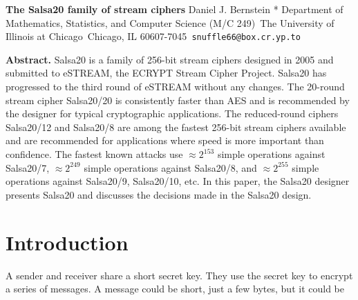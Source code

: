 \documentclass{article}
\begin{document}

\begin{center}
\Large \textbf{The Salsa20 family of stream ciphers}
\vspace{1cm}
\large Daniel J. Bernstein *
\small Department of Mathematics, Statistics, and Computer Science (M/C 249)\
The University of Illinois at Chicago\
Chicago, IL 60607-7045\
\texttt{snuffle66@box.cr.yp.to}
\end{center}

\noindent \textbf{Abstract.} Salsa20 is a family of 256-bit stream ciphers designed in 2005 and submitted to eSTREAM, the ECRYPT Stream Cipher Project. Salsa20 has progressed to the third round of eSTREAM without any changes. The 20-round stream cipher Salsa20/20 is consistently faster than AES and is recommended by the designer for typical cryptographic applications. The reduced-round ciphers Salsa20/12 and Salsa20/8 are among the fastest 256-bit stream ciphers available and are recommended for applications where speed is more important than confidence. The fastest known attacks use $\approx 2^{153}$ simple operations against Salsa20/7, $\approx 2^{249}$ simple operations against Salsa20/8, and $\approx 2^{255}$ simple operations against Salsa20/9, Salsa20/10, etc. In this paper, the Salsa20 designer presents Salsa20 and discusses the decisions made in the Salsa20 design.

\section{Introduction}

A sender and receiver share a short secret key. They use the secret key to encrypt a series of messages. A message could be short, just a few bytes, but it could be
\end{document}

